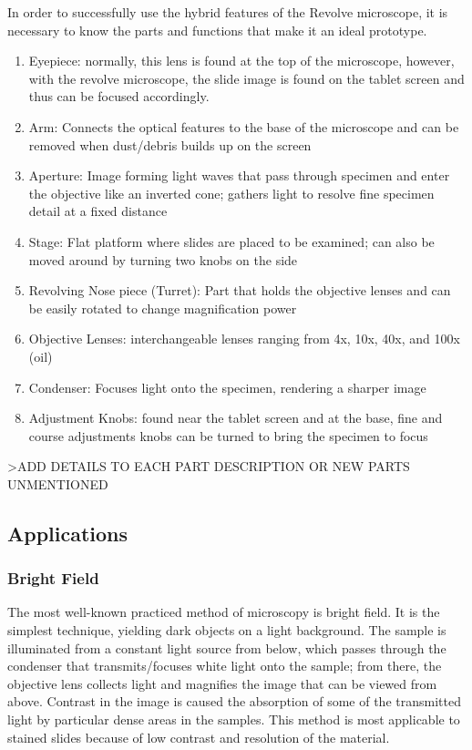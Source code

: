 \documentclass{article}
\begin{document}
In order to successfully use the hybrid features of the Revolve microscope, it is necessary to know the parts and functions that make it an ideal prototype. 
  \begin{enumerate}
  \item Eyepiece: normally, this lens is found  at the top of the microscope, however, with the revolve microscope, the slide image is found on the tablet screen and thus can be focused accordingly.
  \item Arm: Connects the optical features to the base of the microscope and can be removed when dust/debris builds up on the screen 
  \item Aperture: Image forming light waves that pass through specimen and enter the objective like an inverted cone; gathers light to resolve fine specimen detail at a fixed distance
  \item Stage: Flat platform where slides are placed to be examined; can also be moved around by turning two knobs on the side 
  \item Revolving Nose piece (Turret): Part that holds the objective lenses and can be easily rotated to change magnification power
  \item Objective Lenses: interchangeable lenses ranging from 4x, 10x, 40x, and 100x (oil)
  \item Condenser: Focuses light onto the specimen, rendering a sharper image
  \item Adjustment Knobs: found near the tablet screen and at the base, fine and course adjustments knobs can be turned to bring the specimen to focus 
\end{enumerate}
 
 >ADD DETAILS TO EACH PART DESCRIPTION OR NEW PARTS UNMENTIONED 
 
\subsection {Applications}

\subsubsection{Bright Field}
The most well-known practiced method of microscopy is bright field. It is the simplest technique, yielding dark objects on a light background. The sample is illuminated from a constant light source from below, which passes through the condenser that transmits/focuses white light onto the sample; from there, the objective lens collects light and magnifies the image that can be viewed from above. Contrast in the image is caused the absorption of some of the transmitted light by particular dense areas in the samples. This method is most applicable to stained slides because of low contrast and resolution of the material. 
\end{document}
